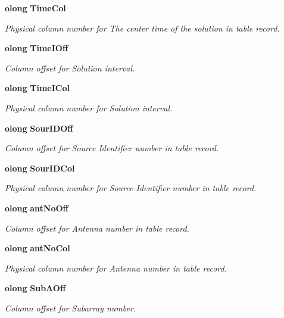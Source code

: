 \begin{CompactItemize}
{\bf olong} {\bf Time\-Col}
\begin{CompactList}\small\item\em Physical column number for The center time of the solution in table record. \item\end{CompactList}\item 
{\bf olong} {\bf Time\-IOff}
\begin{CompactList}\small\item\em Column offset for Solution interval. \item\end{CompactList}\item 
{\bf olong} {\bf Time\-ICol}
\begin{CompactList}\small\item\em Physical column number for Solution interval. \item\end{CompactList}\item 
{\bf olong} {\bf Sour\-IDOff}
\begin{CompactList}\small\item\em Column offset for Source Identifier number in table record. \item\end{CompactList}\item 
{\bf olong} {\bf Sour\-IDCol}
\begin{CompactList}\small\item\em Physical column number for Source Identifier number in table record. \item\end{CompactList}\item 
{\bf olong} {\bf ant\-No\-Off}
\begin{CompactList}\small\item\em Column offset for Antenna number in table record. \item\end{CompactList}\item 
{\bf olong} {\bf ant\-No\-Col}
\begin{CompactList}\small\item\em Physical column number for Antenna number in table record. \item\end{CompactList}\item 
{\bf olong} {\bf Sub\-AOff}
\begin{CompactList}\small\item\em Column offset for Subarray number. \item\end{CompactList}\item 

\end{CompactItemize}

